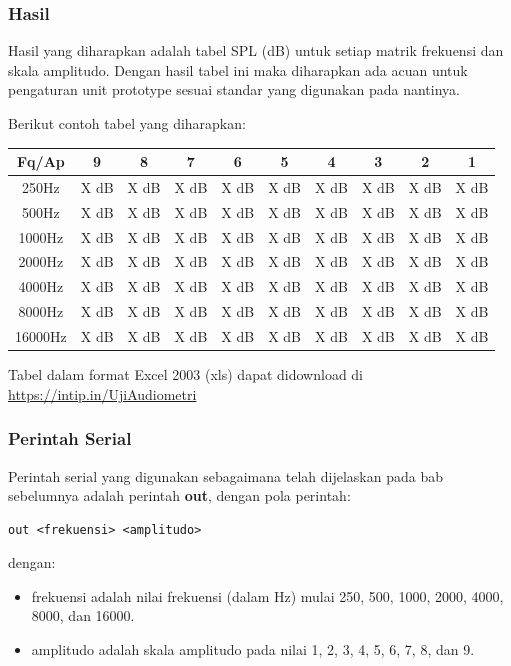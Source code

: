\documentclass[12pt,]{article}
\begin{document}
	\subsubsection{Hasil}
	
	Hasil yang diharapkan adalah tabel SPL (dB) untuk setiap matrik frekuensi dan skala amplitudo.
	Dengan hasil tabel ini maka diharapkan ada acuan untuk pengaturan unit prototype sesuai standar yang digunakan pada nantinya.
	
	Berikut contoh tabel yang diharapkan:
	
	\begin{center}
		\begin{tabular}{|c|c|c|c|c|c|c|c|c|c|}
			\hline
			Fq/Ap & 9 & 8 & 7 & 6 & 5 & 4 & 3 & 2 & 1\\ [0.5ex]
			\hline\hline
			250Hz & X dB & X dB & X dB & X dB & X dB & X dB & X dB & X dB & X dB\\
			\hline
			500Hz & X dB & X dB & X dB & X dB & X dB & X dB & X dB & X dB & X dB\\
			\hline
			1000Hz & X dB & X dB & X dB & X dB & X dB & X dB & X dB & X dB & X dB\\
			\hline
			2000Hz & X dB & X dB & X dB & X dB & X dB & X dB & X dB & X dB & X dB\\
			\hline
			4000Hz & X dB & X dB & X dB & X dB & X dB & X dB & X dB & X dB & X dB\\
			\hline
			8000Hz & X dB & X dB & X dB & X dB & X dB & X dB & X dB & X dB & X dB\\
			\hline
			16000Hz & X dB & X dB & X dB & X dB & X dB & X dB & X dB & X dB & X dB\\
			\hline
		\end{tabular}
	\end{center}
	
	Tabel dalam format Excel 2003 (xls) dapat didownload di \url{https://intip.in/UjiAudiometri}
	
	\subsubsection{Perintah Serial}
	
	Perintah serial yang digunakan sebagaimana telah dijelaskan pada bab sebelumnya adalah perintah \textbf{out},
	dengan pola perintah:
	\begin{verbatim}
out <frekuensi> <amplitudo>
	\end{verbatim}
	dengan:
	\begin{itemize}
		\item frekuensi adalah nilai frekuensi (dalam Hz) mulai 250, 500, 1000, 2000, 4000, 8000, dan 16000.
		\item amplitudo adalah skala amplitudo pada nilai 1, 2, 3, 4, 5, 6, 7, 8, dan 9.
	\end{itemize}
	
\end{document}
